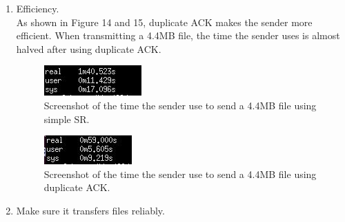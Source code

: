 \documentclass[a4paper]{article}
\begin{document}
\begin{enumerate}[A]
\item Efficiency.\\
As shown in Figure 14 and 15, duplicate ACK makes the sender more efficient. When transmitting a 4.4MB file, the time the sender uses is almost halved after using duplicate ACK.
\begin{figure}[htbp]
\centering
\includegraphics[scale=2]{16.jpg}
\caption{Screenshot of the time the sender use to send a 4.4MB file using simple SR.}
\end{figure}

\begin{figure}[htbp]
\centering
\includegraphics[scale=2]{17.jpg}
\caption{Screenshot of the time the sender use to send a 4.4MB file using duplicate ACK.}
\end{figure}
\item Make sure it transfers files reliably.\\
\end{enumerate}
\end{document}
